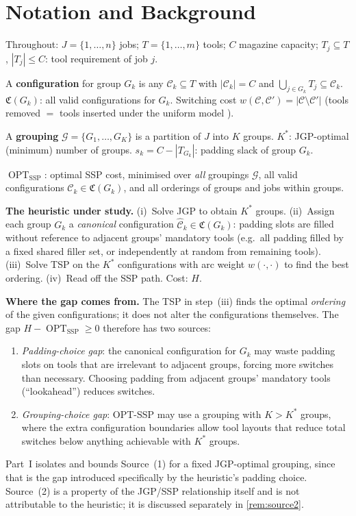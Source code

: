 \documentclass[11pt,a4paper]{article}
\theoremstyle{plain}
\theoremstyle{definition}
\DeclareMathOperator{\OPT}{OPT}
\newcommand{\Cconf}{\mathfrak{C}}
\newcommand{\calG}{\mathcal{G}}
\newcommand{\Kstar}{K^{*}}
\newcommand{\sw}[2]{w(#1,#2)}
\begin{document}
\section{Notation and Background}
\label{sec:notation}

Throughout: $J=\{1,\ldots,n\}$ jobs; $T=\{1,\ldots,m\}$ tools; $C$ magazine capacity;
$T_j\subseteq T$, $|T_j|\le C$: tool requirement of job $j$.

A \textbf{configuration} for group $G_k$ is any $\mathcal{C}_k\subseteq T$ with
$|\mathcal{C}_k|=C$ and $\bigcup_{j\in G_k}T_j\subseteq\mathcal{C}_k$.
$\Cconf(G_k)$: all valid configurations for $G_k$.
Switching cost $\sw{\mathcal{C}}{\mathcal{C}'}=|\mathcal{C}\setminus\mathcal{C}'|$
(tools removed $=$ tools inserted under the uniform model \cite{TangDenardo1988}).

A \textbf{grouping} $\calG=\{G_1,\ldots,G_K\}$ is a partition of $J$ into $K$ groups.
$\Kstar$: JGP-optimal (minimum) number of groups.
$s_k = C-|T_{G_k}|$: padding slack of group $G_k$.

$\OPT_{\mathrm{SSP}}$: optimal SSP cost, minimised over \emph{all} groupings $\calG$,
all valid configurations $\mathcal{C}_k\in\Cconf(G_k)$, and all orderings of groups
and jobs within groups.

\medskip
\noindent\textbf{The heuristic under study.}
(i)~Solve JGP to obtain $\Kstar$ groups.
(ii)~Assign each group $G_k$ a \emph{canonical} configuration
$\hat{\mathcal{C}}_k\in\Cconf(G_k)$: padding slots are filled without reference
to adjacent groups' mandatory tools (e.g.\ all padding filled by a fixed shared
filler set, or independently at random from remaining tools).
(iii)~Solve TSP on the $\Kstar$ configurations with arc weight $\sw{\cdot}{\cdot}$
to find the best ordering.
(iv)~Read off the SSP path. Cost: $H$.

\medskip
\noindent\textbf{Where the gap comes from.}
The TSP in step~(iii) finds the optimal \emph{ordering} of the given configurations;
it does not alter the configurations themselves.
The gap $H-\OPT_{\mathrm{SSP}}\ge 0$ therefore has two sources:
\begin{enumerate}[label=(\arabic*)]
  \item \emph{Padding-choice gap}: the canonical configuration for $G_k$ may waste
        padding slots on tools that are irrelevant to adjacent groups, forcing more
        switches than necessary. Choosing padding from adjacent groups' mandatory
        tools (``lookahead'') reduces switches.
  \item \emph{Grouping-choice gap}: OPT-SSP may use a grouping with $K>\Kstar$ groups,
        where the extra configuration boundaries allow tool layouts that reduce total
        switches below anything achievable with $\Kstar$ groups.
\end{enumerate}
Part~I isolates and bounds Source~(1) for a fixed JGP-optimal grouping, since
that is the gap introduced specifically by the heuristic's padding choice.
Source~(2) is a property of the JGP/SSP relationship itself and is not attributable
to the heuristic; it is discussed separately in \cref{rem:source2}.
\end{document}

